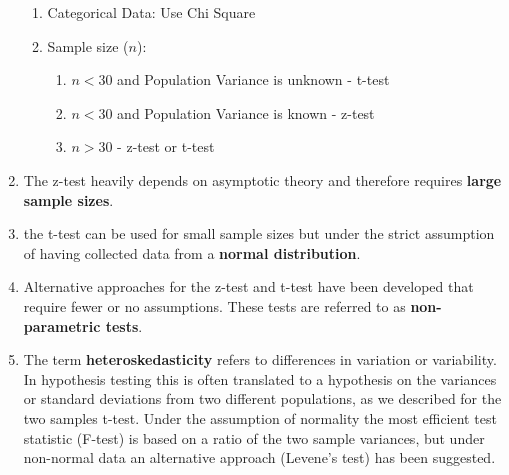 \begin{enumerate}
    \begin{enumerate}
        \item Categorical Data: Use Chi Square
        \hfill \cite{ctl.unm.edu/assets/docs/resources/hypothesis-testing-sheet.pdf}

        \item Sample size ($n$):
        \begin{enumerate}
            \item $n < 30$ and Population Variance is unknown - t-test
            \hfill \cite{ctl.unm.edu/assets/docs/resources/hypothesis-testing-sheet.pdf}

            \item $n < 30$ and Population Variance is known - z-test
            \hfill \cite{ctl.unm.edu/assets/docs/resources/hypothesis-testing-sheet.pdf}

            \item $n > 30$ - z-test or t-test
            \hfill \cite{ctl.unm.edu/assets/docs/resources/hypothesis-testing-sheet.pdf}
        \end{enumerate}
    \end{enumerate}

    \item The z-test heavily depends on asymptotic theory and therefore requires \textbf{large sample sizes}.
    \hfill \cite{statistics/book/Statistics-for-Data-Scientists/Maurits-Kaptein}

    \item the t-test can be used for small sample sizes but under the strict assumption of having collected data from a \textbf{normal distribution}.
    \hfill \cite{statistics/book/Statistics-for-Data-Scientists/Maurits-Kaptein}

    \item Alternative approaches for the z-test and t-test have been developed that require fewer or no assumptions. These tests are referred to as \textbf{non-parametric tests}.
    \hfill \cite{statistics/book/Statistics-for-Data-Scientists/Maurits-Kaptein}

    \item The term \textbf{heteroskedasticity} refers to differences in variation or variability. 
    In hypothesis testing this is often translated to a hypothesis on the variances or standard deviations from two different populations, as we described for the two samples t-test.
    Under the assumption of normality the most efficient test statistic (F-test) is based on a ratio of the two sample variances, but under non-normal data an alternative approach (Levene’s test) has been suggested. 
    \hfill \cite{statistics/book/Statistics-for-Data-Scientists/Maurits-Kaptein}


\end{enumerate}
